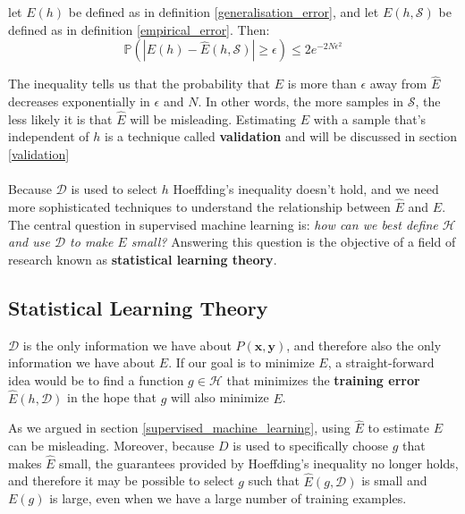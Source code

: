 \begin{theorem}
	let $E(h)$ be defined as in definition \ref{generalisation_error}, and let $E(h, \mathcal{S})$ be defined as in definition \ref{empirical_error}. Then:
	$$
	\mathbb{P}\left( |E(h) - \hat{E}(h, \mathcal{S})| \geq \epsilon \right) \leq 2e^{-2N\epsilon^2}
	$$
\end{theorem}

The inequality tells us that the probability that $E$ is more than $\epsilon$ away from $\hat{E}$ decreases exponentially in $\epsilon$ and $N$. In other words, the more samples in $\mathcal{S}$, the less likely it is that $\hat{E}$ will be misleading. Estimating $E$ with a sample that's independent of $h$ is a technique called \textbf{validation} and will be discussed in section \ref{validation}
\\\\
Because $\mathcal{D}$ is used to select $h$ Hoeffding's inequality doesn't hold, and we need more sophisticated techniques to understand the relationship between $\hat{E}$ and $E$. The central question in supervised machine learning is: \textit{how can we best define $\mathcal{H}$ and use $\mathcal{D}$ to make $E$ small?} Answering this question is the objective of a field of research known as \textbf{statistical learning theory}.

\subsection{Statistical Learning Theory}
\label{statistical_learning_theory}
$\mathcal{D}$ is the only information we have about $P(\mathbf{x}, \mathbf{y})$, and therefore also the only information we have about $E$. If our goal is to minimize $E$, a straight-forward idea would be to find a function $g \in \mathcal{H}$ that minimizes the \textbf{training error} $\hat{E}(h, \mathcal{D})$ in the hope that $g$ will also minimize $E$. 

As we argued in section \ref{supervised_machine_learning}, using $\hat{E}$ to estimate $E$ can be misleading. Moreover, because $D$ is used to specifically choose $g$ that makes $\hat{E}$ small, the guarantees provided by Hoeffding's inequality no longer holds, and therefore it may be possible to select $g$ such that $\hat{E}(g, \mathcal{D})$ is small and $E(g)$ is large, even when we have a large number of training examples.

